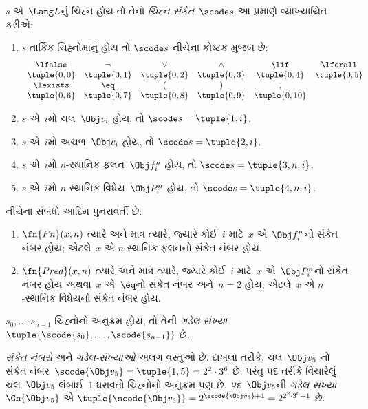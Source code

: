 \begin{defn}
$s$ એ~$\Lang L$નું ચિહ્ન હોય તો
તેનો \emph{ચિહ્ન-સંકેત}~$\scode s$
આ પ્રમાણે વ્યાખ્યાયિત કરીએ:
\begin{enumerate}
\item $s$ તાર્કિક ચિહ્નોમાંનું હોય તો
  $\scode s$ નીચેના કોષ્ટક મુજબ છે:
\[
\begin{array}{cccccccccc}
  \lfalse & \lnot & \lor & \land & \lif & \lforall \\
\tuple{0, 0} & \tuple{0, 1} & \tuple{0, 2} & \tuple{0, 3} &
\tuple{0, 4} & \tuple{0, 5} \\
\lexists & \eq & ( & ) & ,\\
\tuple{0, 6} & \tuple{0, 7} &
\tuple{0, 8} & \tuple{0, 9} & \tuple{0, 10}
\end{array}
\]
\item $s$ એ~$i$મો ચલ~$\Obj v_i$ હોય, તો $\scode s = \tuple{1, i}$.
\item $s$ એ~$i$મો અચળ~$\Obj c_i$ હોય, તો
  $\scode s = \tuple{2, i}$.
\item $s$ એ~$i$મો $n$-સ્થાનિક ફલન~$\Obj f_i^n$ હોય, તો
  $\scode s = \tuple{3, n, i}$.
\item $s$ એ~$i$મો $n$-સ્થાનિક વિધેય~$\Obj P_i^n$ હોય, તો
  $\scode s = \tuple{4, n, i}$.
\end{enumerate}
\end{defn}

\begin{prop}
નીચેના સંબંધો આદિમ પુનરાવર્તી છે:
\begin{enumerate}
\item $\fn{Fn}(x, n)$ ત્યારે અને માત્ર ત્યારે,
  જ્યારે કોઈ~$i$ માટે~$x$ એ~$\Obj f^n_i$નો
  સંકેત નંબર હોય; એટલે~$x$ એ $n$-સ્થાનિક
  ફલનનો સંકેત નંબર હોય.
\item $\fn{Pred}(x, n)$ ત્યારે અને માત્ર ત્યારે,
  જ્યારે કોઈ~$i$ માટે~$x$ એ~$\Obj P^n_i$નો
  સંકેત નંબર હોય અથવા~$x$ એ~$\eq$નો
  સંકેત નંબર અને~$n = 2$ હોય; એટલે~$x$
  એ $n$-સ્થાનિક વિધેયનો સંકેત
  નંબર હોય.
\end{enumerate}
\end{prop}

\begin{defn}
$s_0, \dots, s_{n-1}$ ચિહ્નોનો અનુક્રમ
હોય, તો તેની \emph{ગડેલ-સંખ્યા}
$\tuple{\scode{s_0}, \dots, \scode{s_{n-1}}}$ છે.
\end{defn}

\begin{explain}
\emph{સંકેત નંબરો} અને \emph{ગડેલ-સંખ્યાઓ}
અલગ વસ્તુઓ છે. દાખલા તરીકે, ચલ~$\Obj v_5$
નો સંકેત નંબર~$\scode{\Obj
  v_5} = \tuple{1, 5} = 2^2\cdot 3^6$ છે.
પરંતુ પદ તરીકે વિચારેલું ચલ~$\Obj v_5$
લંબાઈ~$1$ ધરાવતો ચિહ્નોનો અનુક્રમ પણ
છે. \emph{પદ}~$\Obj v_5$ની
\emph{ગડેલ-સંખ્યા}~$\Gn{\Obj v_5}$ એ
$\tuple{\scode{\Obj v_5}} = 2^{\scode{\Obj
    v_5} + 1} = 2^{2^2\cdot 3^6 + 1}$ છે.
\end{explain}

